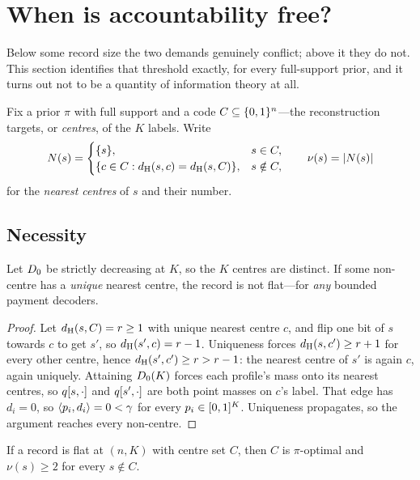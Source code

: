 \section{When is accountability free?}
\label{sec:threshold}

Below some record size the two demands genuinely conflict; above it they do not.
This section identifies that threshold exactly, for every full-support prior, and
it turns out not to be a quantity of information theory at all.

Fix a prior $\pi$ with full support and a code $C \subseteq \{0,1\}^n$---the
reconstruction targets, or \emph{centres}, of the $K$ labels. Write
\[
  N(s) =
  \begin{cases}
    \{s\}, & s \in C,\\
    \{c \in C : d_{\mathrm{H}}(s,c) = d_{\mathrm{H}}(s,C)\}, & s \notin C,
  \end{cases}
  \qquad \nu(s) = |N(s)|
\]
for the \emph{nearest centres} of $s$ and their number.

\subsection{Necessity}

\begin{lemma}[Necessity]
\label{lem:necessity}
Let $D_0$ be strictly decreasing at $K$, so the $K$ centres are distinct. If
some non-centre has a \emph{unique} nearest centre, the record is not flat---for
\emph{any} bounded payment decoders.
\end{lemma}

\begin{proof}
Let $d_{\mathrm{H}}(s,C) = r \ge 1$ with unique nearest centre $c$, and flip one bit of $s$
towards $c$ to get $s'$, so $d_{\mathrm{H}}(s',c) = r-1$. Uniqueness forces
$d_{\mathrm{H}}(s,c') \ge r+1$ for every other centre, hence $d_{\mathrm{H}}(s',c') \ge r > r-1$: the
nearest centre of $s'$ is again $c$, again uniquely. Attaining $D_0(K)$ forces
each profile's mass onto its nearest centres, so $q[s,\cdot]$ and
$q[s',\cdot]$ are both point masses on $c$'s label. That edge has $d_i = 0$,
so $\langle p_i, d_i\rangle = 0 < \gamma$ for every $p_i \in [0,1]^K$.
Uniqueness propagates, so the argument reaches every non-centre.
\end{proof}

\begin{proposition}
\label{prop:necessity-general}
If a record is flat at $(n,K)$ with centre set $C$, then $C$ is $\pi$-optimal and
$\nu(s) \ge 2$ for every $s \notin C$.
\end{proposition}

